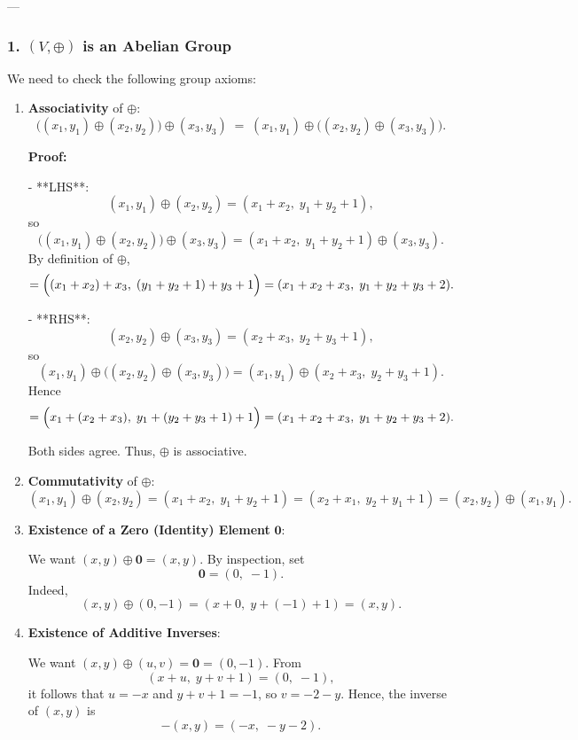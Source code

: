 \documentclass[12pt]{article}
\begin{document}
---
\newpage
\subsubsection*{1. \((V, \oplus)\) is an Abelian Group}

We need to check the following group axioms:

\begin{enumerate}
    \item \textbf{Associativity} of \(\oplus\):
    \[
    \bigl((x_1,y_1)\oplus(x_2,y_2)\bigr)\oplus(x_3,y_3)
    \;=\;(x_1,y_1)\oplus\bigl((x_2,y_2)\oplus(x_3,y_3)\bigr).
    \]
    
    \textbf{Proof:}
    
    - **LHS**:
    \[
    (x_1,y_1)\oplus(x_2,y_2) = (x_1 + x_2,\; y_1 + y_2 + 1),
    \]
    so
    \[
    \bigl((x_1,y_1)\oplus(x_2,y_2)\bigr)\oplus(x_3,y_3)
    = (x_1 + x_2,\; y_1 + y_2 + 1)\oplus(x_3,y_3).
    \]
    By definition of \(\oplus\),
    \[
    = \Bigl((x_1 + x_2) + x_3,\; (y_1 + y_2 + 1) + y_3 + 1\Bigr)
    = (x_1 + x_2 + x_3,\; y_1 + y_2 + y_3 + 2).
    \]
    
    - **RHS**:
    \[
    (x_2,y_2)\oplus(x_3,y_3) = (x_2 + x_3,\; y_2 + y_3 + 1),
    \]
    so
    \[
    (x_1,y_1)\oplus\bigl((x_2,y_2)\oplus(x_3,y_3)\bigr)
    = (x_1,y_1)\oplus(x_2 + x_3,\; y_2 + y_3 + 1).
    \]
    Hence
    \[
    = \Bigl(x_1 + (x_2 + x_3),\; y_1 + (y_2 + y_3 + 1) + 1\Bigr)
    = (x_1 + x_2 + x_3,\; y_1 + y_2 + y_3 + 2).
    \]
    
    Both sides agree. Thus, \(\oplus\) is associative.
    
    \item \textbf{Commutativity} of \(\oplus\):
    \[
    (x_1,y_1) \oplus (x_2,y_2) 
    = (x_1 + x_2,\; y_1 + y_2 + 1) 
    = (x_2 + x_1,\; y_2 + y_1 + 1) 
    = (x_2,y_2) \oplus (x_1,y_1).
    \]
    
    \item \textbf{Existence of a Zero (Identity) Element} \(\mathbf{0}\):
    
    We want \((x,y)\oplus \mathbf{0} = (x,y)\). By inspection, set
    \[
    \mathbf{0} = (0,\;-1).
    \]
    Indeed,
    \[
    (x,y)\oplus(0,-1) = (x + 0,\; y + (-1) + 1) = (x,y).
    \]
    
    \item \textbf{Existence of Additive Inverses}:
    
    We want \((x,y) \oplus (u,v) = \mathbf{0} = (0,-1)\). From
    \[
    (x + u,\; y + v + 1) = (0,\;-1),
    \]
    it follows that \(u = -x\) and \(y + v + 1 = -1\), so \(v = -2 - y\).  
    Hence, the inverse of \((x,y)\) is
    \[
    -(x,y) = (-x,\; -y - 2).
    \]
\end{enumerate}
\end{document}
